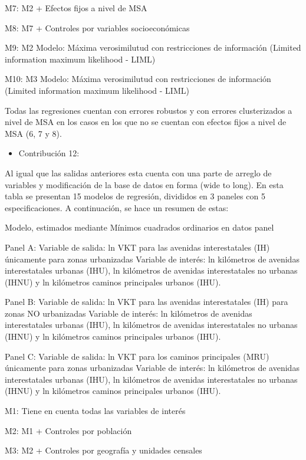 \documentclass[
]{article}
\providecommand{\tightlist}{%
  \setlength{\itemsep}{0pt}\setlength{\parskip}{0pt}}
\begin{document}
M7: M2 + Efectos fijos a nivel de MSA

M8: M7 + Controles por variables socioeconómicas

M9: M2 Modelo: Máxima verosimilutud con restricciones de información
(Limited information maximum likelihood - LIML)

M10: M3 Modelo: Máxima verosimilutud con restricciones de información
(Limited information maximum likelihood - LIML)

Todas las regresiones cuentan con errores robustos y con errores
clusterizados a nivel de MSA en los casos en los que no se cuentan con
efectos fijos a nivel de MSA (6, 7 y 8).

\begin{itemize}
\tightlist
\item
  Contribución 12:
\end{itemize}

Al igual que las salidas anteriores esta cuenta con una parte de arreglo
de variables y modificación de la base de datos en forma (wide to long).
En esta tabla se presentan 15 modelos de regresión, divididos en 3
paneles con 5 especificaciones. A continuación, se hace un resumen de
estas:

Modelo, estimados mediante Mínimos cuadrados ordinarios en datos panel

Panel A: Variable de salida: ln VKT para las avenidas interestatales
(IH) únicamente para zonas urbanizadas Variable de interés: ln
kilómetros de avenidas interestatales urbanas (IHU), ln kilómetros de
avenidas interestatales no urbanas (IHNU) y ln kilómetros caminos
principales urbanos (IHU).

Panel B: Variable de salida: ln VKT para las avenidas interestatales
(IH) para zonas NO urbanizadas Variable de interés: ln kilómetros de
avenidas interestatales urbanas (IHU), ln kilómetros de avenidas
interestatales no urbanas (IHNU) y ln kilómetros caminos principales
urbanos (IHU).

Panel C: Variable de salida: ln VKT para los caminos principales (MRU)
únicamente para zonas urbanizadas Variable de interés: ln kilómetros de
avenidas interestatales urbanas (IHU), ln kilómetros de avenidas
interestatales no urbanas (IHNU) y ln kilómetros caminos principales
urbanos (IHU).

M1: Tiene en cuenta todas las variables de interés

M2: M1 + Controles por población

M3: M2 + Controles por geografía y unidades censales
\end{document}
